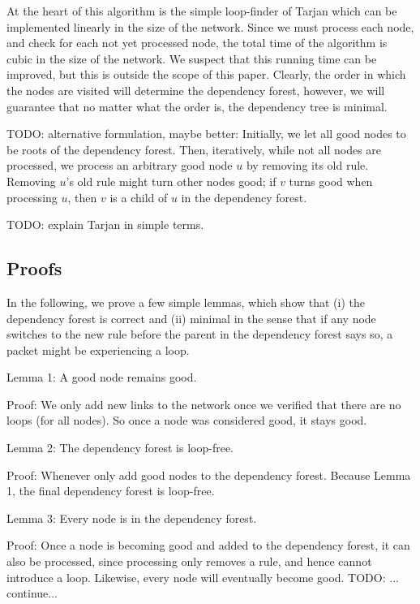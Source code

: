 At the heart of this algorithm is the simple loop-finder of Tarjan \cite{reference_1_in_http://en.wikipedia.org/wiki/Tarjan's_strongly_connected_components_algorithm} which can be implemented linearly in the size of the network. Since we must process each node, and check for each not yet processed node, the total time of the algorithm is cubic in the size of the network. We suspect that this running time can be improved, but this is outside the scope of this paper. Clearly, the order in which the nodes are visited will determine the dependency forest, however, we will guarantee that no matter what the order is, the dependency tree is minimal.

TODO: alternative formulation, maybe better: Initially, we let all good nodes to be roots of the dependency forest. Then, iteratively, while not all nodes are processed, we process an arbitrary good node $u$ by removing its old rule. Removing $u$'s old rule might turn other nodes good; if $v$ turns good when processing $u$, then $v$ is a child of $u$ in the dependency forest.

TODO: explain Tarjan in simple terms.

\subsection{Proofs} %

In the following, we prove a few simple lemmas, which show that (i) the dependency forest is correct and (ii) minimal in the sense that if any node switches to the new rule before the parent in the dependency forest says so, a packet might be experiencing a loop.


Lemma 1: A good node remains good.

Proof: We only add new links to the network once we verified that there are no loops (for all nodes). So once a node was considered good, it stays good.


Lemma 2: The dependency forest is loop-free. 

Proof: Whenever only add good nodes to the dependency forest. Because Lemma 1, the final dependency forest is loop-free.

Lemma 3: Every node is in the dependency forest.

Proof: Once a node is becoming good and added to the dependency forest, it can also be processed, since processing only removes a rule, and hence cannot introduce a loop. Likewise, every node will eventually become good. TODO: ... continue...

